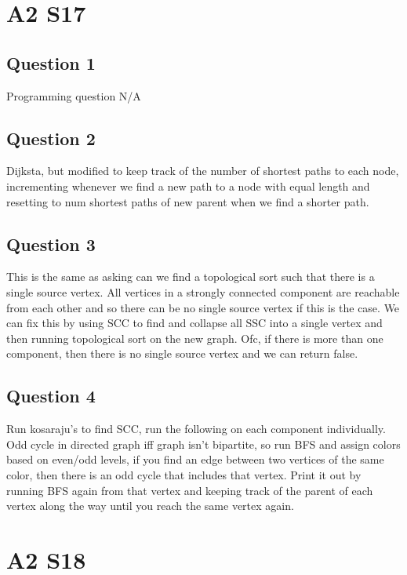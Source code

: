 \documentclass[11pt]{article}
\begin{document}
\section{A2 S17}

\subsection{Question 1}

Programming question N/A

\subsection{Question 2}

Dijksta, but modified to keep track of the number of shortest paths to each node, incrementing whenever we find a new path to a node with equal length and resetting to num shortest paths of new parent when we find a shorter path.

\subsection{Question 3}

This is the same as asking can we find a topological sort such that there is a single source vertex. All vertices in a strongly connected component are reachable from each other and so there can be no single source vertex if this is the case. We can fix this by using SCC to find and collapse all SSC into a single vertex and then running topological sort on the new graph. Ofc, if there is more than one component, then there is no single source vertex and we can return false.

\subsection{Question 4}

Run kosaraju's to find SCC, run the following on each component individually. Odd cycle in directed graph iff graph isn't bipartite, so run BFS and assign colors based on even/odd levels, if you find an edge between two vertices of the same color, then there is an odd cycle that includes that vertex. Print it out by running BFS again from that vertex and keeping track of the parent of each vertex along the way until you reach the same vertex again.

\section{A2 S18}
\end{document}
